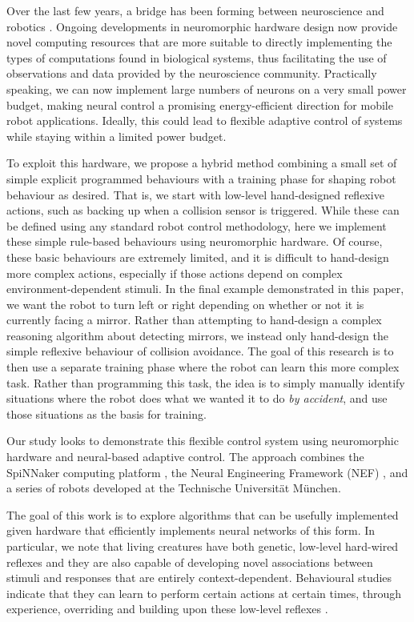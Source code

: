 \documentclass[conference]{IEEEtran}
\begin{document}
Over the last few years, a bridge has been forming between neuroscience and 
robotics \cite{krichmar2011}. Ongoing developments in neuromorphic hardware 
design now provide novel computing resources that are more suitable to
directly implementing the types of computations found in biological systems, 
thus facilitating the use of observations and data provided by the 
neuroscience community. Practically speaking, we can now implement large numbers of 
neurons on a very small power budget, making neural control a promising 
energy-efficient direction for mobile robot applications.  Ideally, this could
lead to flexible adaptive control of systems while staying within a limited
power budget.

To exploit this hardware, we propose a hybrid method combining a small set of
simple explicit programmed behaviours with a training phase for shaping robot
behaviour as desired.  That is, we start with low-level hand-designed reflexive
actions, such as backing up when a collision sensor is triggered.  While these can be defined using
any standard robot control methodology, here we implement these simple rule-based
behaviours using neuromorphic hardware.  Of course, these basic behaviours
are extremely limited, and it is difficult to hand-design more complex actions,
especially if those actions depend on complex environment-dependent stimuli.
In the final example demonstrated in this paper, we want the robot to turn
left or right depending on whether or not it is currently facing a mirror.
Rather than attempting to hand-design a complex reasoning algorithm about detecting
mirrors, we instead only hand-design the simple reflexive behaviour of collision
avoidance.  The goal of this research is to then use a separate training phase
where the robot can learn this more complex task.  Rather than programming this
task, the idea is to simply manually identify situations where the robot
does what we wanted it to do \textit{by accident}, and use those situations as
the basis for training.

Our study looks to demonstrate this flexible control system using 
neuromorphic hardware and neural-based adaptive control. The approach 
combines the SpiNNaker computing 
platform \cite{furber2007neural, furber2014spinnaker}, the Neural Engineering 
Framework (NEF)  \cite{eliasmith2004neural}, and a series of robots developed at 
the Technische Universit{\"a}t M{\"u}nchen. 

The goal of this work is to explore algorithms that can be usefully implemented
given hardware that efficiently implements neural networks of this form.  In
particular, we note that living creatures have both genetic, low-level 
hard-wired reflexes and they are also capable of developing novel associations 
between stimuli and responses that are entirely context-dependent. Behavioural 
studies indicate that they can learn to perform certain actions at certain 
times, through experience, overriding and building upon these low-level 
reflexes \cite{kim2007encoding}. 
\end{document}
